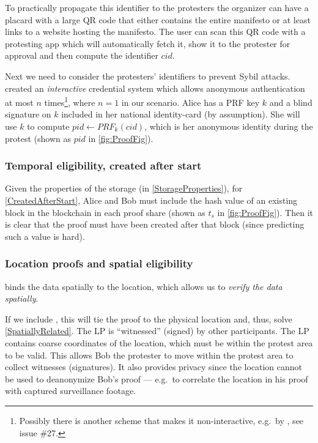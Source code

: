 To practically propagate this identifier to the protesters the organizer can 
have a placard with a large QR code that either contains the entire manifesto or 
at least links to a website hosting the manifesto.
The user can scan this QR code with a protesting app which will automatically 
fetch it, show it to the protester for approval and then compute the identifier 
\(cid\).

Next we need to consider the protesters' identifiers to prevent Sybil attacks.
\Textcite{HowToWinTheCloneWars} created an \emph{interactive} credential system 
which allows anonymous authentication at most \(n\) times\footnote{%
  Possibly there is another scheme that makes it non-interactive, e.g.\ by 
  \Textcite{Psignatures}, see issue \#27.
}, where \(n = 1\) in our scenario.
Alice has a \ac{PRF} key \(k\) and a blind signature on \(k\) included in her 
national identity-card (by assumption).
She will use \(k\) to compute \(pid\gets PRF_k(cid)\), which is her anonymous 
identity during the protest (shown as \(pid\) in \cref{fig:ProofFig}).

\subsubsection{Temporal eligibility, created after start}

Given the properties of the storage (in \cref{StorageProperties}), for 
\cref{CreatedAfterStart}, Alice and Bob must include the hash value of an 
existing block in the blockchain in each proof share (shown as \(t_s\) in 
\cref{fig:ProofFig}).
Then it is clear that the proof must have been created after that block (since 
predicting such a value is hard).

\subsubsection{Location proofs and spatial eligibility}

 binds the data spatially to the location, which allows 
us to \emph{verify the data spatially}.

If we include , this will tie the proof to the physical location and, 
thus, solve \cref{SpatiallyRelated}.
The \ac{LP} is \enquote{witnessed} (signed) by other participants.
The \ac{LP} contains coarse coordinates of the location, which must be within 
the protest area to be valid.
This allows Bob the protester to move within the protest area to collect 
witnesses (signatures).
It also provides privacy since the location cannot be used to deanonymize Bob's 
proof --- e.g.\ to correlate the location in his proof with captured 
surveillance footage.

